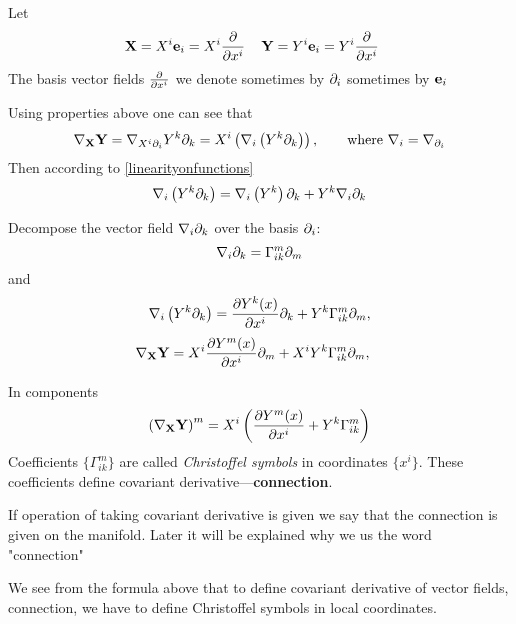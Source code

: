 \documentclass[12pt]{article}
\theoremstyle{theorem}
\numberwithin{equation}{section}
\begin{document}
Let
         $$
      {\bf X}=X^i{\bf e}_i=X^i{\partial\over \partial x^i}\,\quad {\bf Y}=Y^i{\bf e}_i=Y^i{\partial\over \partial x^i}\,\quad
         $$
The basis vector fields ${\partial\over \partial x^i}$ we denote sometimes 
by $\partial_i$ sometimes by ${\bf e}_i$


  Using properties above one can see that
\begin{equation}\label{explicitexpression}
  \nabla_{\bf X}{\bf Y}=\nabla_{X^i\partial_i}{Y^k \partial_k}
  =X^i\left(\nabla_i\left(Y^k\partial_k\right)\right),\qquad
  \hbox{where $\nabla_i=\nabla_{\partial_i}$}
\end{equation}
Then  according to \eqref{linearityonfunctions}
                 $$
           \nabla_i
            \left(
             Y^k \partial_k
            \right)=
              \nabla_i
              \left(Y^k\right)\partial_k+
            Y^k \nabla_i \partial_k
                   $$

 Decompose the vector field  $\nabla_i \partial_k$ over the basis $\partial_i$:
             \begin{equation}\label{cristoffelinlocalcoordiantes1}
                \nabla_i \partial_k=\Gamma_{ik}^m\partial_m
              \end{equation}
             and
\begin{equation}\label{covariantderivative}
    \nabla_i\left({Y^k \partial_k}\right)=
    {\partial Y^k(x)\over \partial x^i}{\partial}_k+Y^k\Gamma_{ik}^m\partial_m,
\end{equation}
   \begin{equation}\label{covariantderivative2}
    \nabla_{\bf X} {\bf Y}=
    X^i{\partial Y^m(x)\over \partial x^i}\partial_m+X^iY^k\Gamma_{ik}^m\partial_m,\quad
    \end{equation}

    In components
           \begin{equation}\label{covderivincomponents}
             \left( \nabla_{\bf X} {\bf Y}\right)^m=
    X^i\left({\partial Y^m(x)\over \partial x^i}+Y^k\Gamma_{ik}^m\right)
           \end{equation}
    Coefficients $\{\Gamma_{ik}^m\}$ are called {\it Christoffel symbols} in coordinates $\{x^i\}$.
These coefficients define covariant derivative---{\bf connection}.


If operation of taking covariant derivative is given we say that the connection is given on the manifold.
Later it will be explained why we us the word "connection"


We see from the formula above that to define covariant derivative of vector fields, connection,
we have to define Christoffel symbols in local coordinates.
\end{document}
